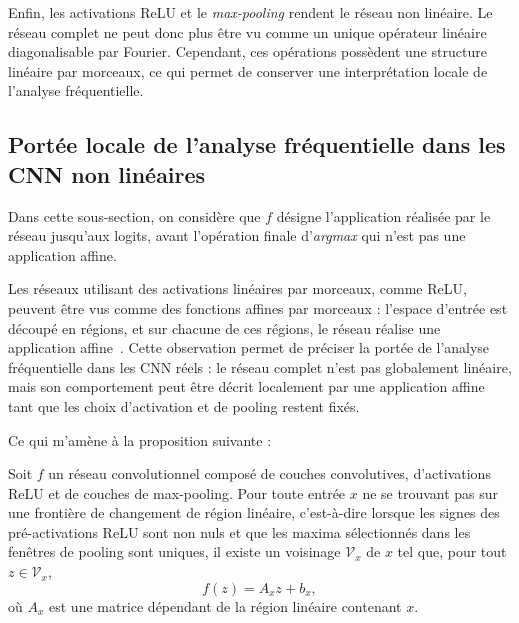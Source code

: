 Enfin, les activations ReLU et le \textit{max-pooling} rendent le réseau non linéaire. Le réseau
complet ne peut donc plus être vu comme un unique opérateur linéaire diagonalisable par Fourier.
Cependant, ces opérations possèdent une structure linéaire par morceaux, ce qui permet de
conserver une interprétation locale de l'analyse fréquentielle.

\subsection{Portée locale de l'analyse fréquentielle dans les CNN non linéaires}

Dans cette sous-section, on considère que $f$ désigne l'application réalisée par le réseau
jusqu'aux logits, avant l'opération finale d'\textit{argmax} qui n'est pas une application affine.

Les réseaux utilisant des activations linéaires par morceaux, comme ReLU, peuvent être vus
comme des fonctions affines par morceaux : l'espace d'entrée est découpé en régions, et sur
chacune de ces régions, le réseau réalise une application affine~\cite{montufar2014number,balestriero2018spline}.
Cette observation permet de préciser la portée de l'analyse fréquentielle dans les CNN réels :
le réseau complet n'est pas globalement linéaire, mais son comportement peut être décrit
localement par une application affine tant que les choix d'activation et de pooling restent fixés.

Ce qui m'amène à la proposition suivante :

\begin{proposition}
Soit $f$ un réseau convolutionnel composé de couches convolutives, d'activations ReLU et de
couches de max-pooling. Pour toute entrée $x$ ne se trouvant pas
sur une frontière de changement de région linéaire, c'est-à-dire lorsque les signes des
pré-activations ReLU sont non nuls et que les maxima sélectionnés dans les fenêtres de pooling
sont uniques, il existe un voisinage $\mathcal{V}_x$ de $x$ tel que, pour tout
$z \in \mathcal{V}_x$,
\[
    f(z) = A_x z + b_x,
\]
où $A_x$ est une matrice dépendant de la région linéaire contenant $x$.
\end{proposition}

